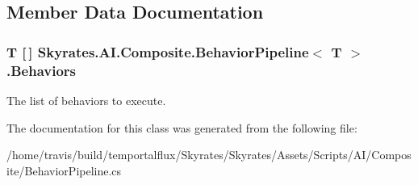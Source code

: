 \subsection{Member Data Documentation}
\hypertarget{class_skyrates_1_1_a_i_1_1_composite_1_1_behavior_pipeline_3_01_t_01_4_a2aab9838c797aba8c79d66325e6e2874}{
\subsubsection[{Behaviors}]{\setlength{\rightskip}{0pt plus 5cm}T \mbox{[}$\,$\mbox{]} {\bf Skyrates.\-A\-I.\-Composite.\-Behavior\-Pipeline}$<$ T $>$.Behaviors}}\label{class_skyrates_1_1_a_i_1_1_composite_1_1_behavior_pipeline_3_01_t_01_4_a2aab9838c797aba8c79d66325e6e2874}


The list of behaviors to execute. 



The documentation for this class was generated from the following file\-:\begin{DoxyCompactItemize}
\item 
/home/travis/build/temportalflux/\-Skyrates/\-Skyrates/\-Assets/\-Scripts/\-A\-I/\-Composite/Behavior\-Pipeline.\-cs\end{DoxyCompactItemize}
